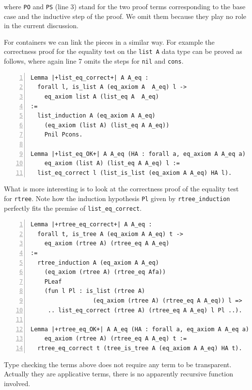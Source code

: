 \documentclass[sigplan,10pt,review]{acmart}\settopmatter{printfolios=true,printccs=false,printacmref=false}
\begin{document}
\noindent
where \lstinline+PO+ and \lstinline+PS+ (line 3) stand for
the two proof terms corresponding to the base case and the inductive
step of the proof. We omit them because they play no role in the
current discussion.

For containers we can link the pieces in a similar way.
For example the correctness proof
for the equality test on the \lstinline+list A+ data type can be
proved as follows, where again line 7 omits the steps for
\lstinline+nil+ and \lstinline+cons+.

\begin{minipage}{\textwidth}\begin{lstlisting}[numbers=left]
Lemma |+list_eq_correct+| A A_eq :
  forall l, is_list A (eq_axiom A  A_eq) l ->
    eq_axiom list A (list_eq A  A_eq)
:=
  list_induction A (eq_axiom A A_eq)
    (eq_axiom (list A) (list_eq A A_eq))
    Pnil Pcons.

Lemma |+list_eq_OK+| A A_eq (HA : forall a, eq_axiom A A_eq a) l :
    eq_axiom (list A) (list_eq A A_eq) l :=
  list_eq_correct l (list_is_list (eq_axiom A A_eq) HA l).
\end{lstlisting}\end{minipage}

\noindent
What is more interesting is to look at the correctness 
proof of the equality test
for \lstinline+rtree+. Note how the induction hypothesis
\lstinline+Pl+
given by \lstinline+rtree_induction+ perfectly fits
the premise of \lstinline+list_eq_correct+.

\begin{minipage}{\textwidth}\begin{lstlisting}[numbers=left]
Lemma |+rtree_eq_correct+| A A_eq :
  forall t, is_tree A (eq_axiom A A_eq) t ->
    eq_axiom (rtree A) (rtree_eq A A_eq)
:=
  rtree_induction A (eq_axiom A A_eq)
    (eq_axiom (rtree A) (rtree_eq Afa))
    PLeaf
    (fun l Pl : is_list (rtree A) 
                  (eq_axiom (rtree A) (rtree_eq A A_eq)) l =>
     .. list_eq_correct (rtree A) (rtree_eq A A_eq) l Pl ..).

Lemma |+rtree_eq_OK+| A A_eq (HA : forall a, eq_axiom A A_eq a) t :
    eq_axiom (rtree A) (rtree_eq A A_eq) t :=
  rtree_eq_correct t (tree_is_tree A (eq_axiom A A_eq) HA t).
\end{lstlisting}\end{minipage}

Type checking the terms above does not require any term to be
transparent. Actually they are applicative terms, there is no
apparently recursive function involved.
\end{document}
